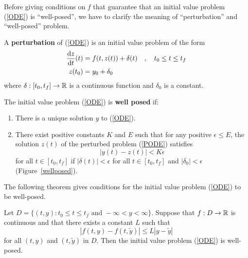 Before giving conditions on $f$ that guarantee that an initial value
problem (\ref{ODE}) is ``well-posed'', we have to clarify the
meaning of ``perturbation'' and ``well-posed'' problem.

\begin{defn}
A {\bfseries perturbation}
of (\ref{ODE}) is an initial value problem
of the form
\begin{equation} \label{PODE}
\begin{split}
\frac{\mathrm{d}z}{\mathrm{d}{t}}(t) &= f(t,z(t)) +\delta(t) \quad,\quad t_0 \leq t \leq t_f \\
z(t_0) & = y_0 + \delta_0
\end{split}
\end{equation}
where $\delta:[t_0,t_f]\rightarrow \mathbb{R}$ is a continuous function and
$\delta_0$ is a constant.
\label{pertub_def}
\end{defn}

\begin{defn}
The initial value problem (\ref{ODE}) is
{\bfseries well posed} if:
\begin{enumerate}
\item There is a unique solution $y$ to (\ref{ODE}).
\item There exist positive constants $K$ and $E$ such that for any
positive $\epsilon \leq E$, the solution $z(t)$ of the perturbed
problem (\ref{PODE}) satisfies
\[
\left| y(t) - z(t) \right| < K\epsilon
\]
for all $t \in [t_0,t_f]$ if 
$|\delta(t)| < \epsilon$ for all $t \in [t_0,t_f]$ and
$|\delta_0| < \epsilon$ (Figure~\ref{wellposed}).
\end{enumerate}
\label{well_posed}
\end{defn}


The following theorem gives conditions for the initial value problem
(\ref{ODE}) to be well-posed.

\begin{theorem}
Let $D = \{(t,y) : t_0 \leq t \leq t_f \text{ and } -\infty < y < \infty \}$.
Suppose that $f:D \rightarrow \mathbb{R}$ is continuous and that there exists
a constant $L$ such that
\begin{equation} \label{Lipschitz}
|f(t,y) - f(t,\tilde{y})| \leq L | y - \tilde{y}|
\end{equation}
for all $(t,y)$ and $(t,\tilde{y})$ in $D$.  Then the initial value
problem (\ref{ODE}) is well-posed.
\label{WellPossedTh}
\end{theorem}

